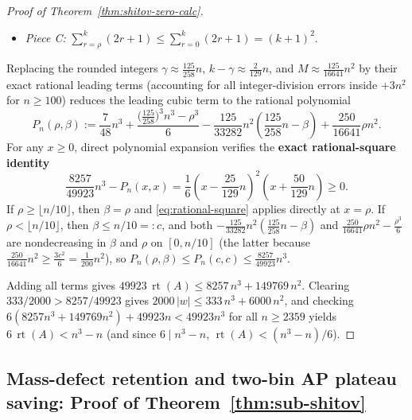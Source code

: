 \documentclass[11pt]{article}
\theoremstyle{definition}
\theoremstyle{remark}
\newcommand{\rt}{\operatorname{rt}}
\begin{document}
\begin{proof}[Proof of Theorem~\ref{thm:shitov-zero-calc}]
\begin{itemize}[leftmargin=2em]
  \[
    \text{Piece B} \le 2 (\gamma + 1)(k - \gamma) \sum_{i=1}^{k} s_i \le 2 \rho (\gamma + 1)(k - \gamma).
  \]
  \item \emph{Piece C:} $\sum_{r=\rho}^k (2r + 1) \le \sum_{r=0}^k (2r + 1) = (k + 1)^2$.
\end{itemize}
Replacing the rounded integers $\gamma \approx \frac{125}{258} n$, $k - \gamma \approx \frac{2}{129} n$, and $M \approx \frac{125}{16641} n^2$ by their exact rational leading terms (accounting for all integer-division errors inside $+3 n^2$ for $n \ge 100$) reduces the leading cubic term to the rational polynomial
\[
  P_n(\rho, \beta) := \frac{7}{48} n^3 + \frac{\bigl(\frac{125}{258}\bigr)^3 n^3 - \rho^3}{6}
    - \frac{125}{33282} n^2 \left(\frac{125}{258} n - \beta\right)
    + \frac{250}{16641} \rho n^2.
\]
For any $x \ge 0$, direct polynomial expansion verifies the \textbf{exact rational-square identity}
\begin{equation}\label{eq:rational-square}
  \frac{8257}{49923} n^3 - P_n(x, x)
  = \frac{1}{6}\left(x - \frac{25}{129} n\right)^2 \left(x + \frac{50}{129} n\right) \ge 0.
\end{equation}
If $\rho \ge \lfloor n/10 \rfloor$, then $\beta = \rho$ and \eqref{eq:rational-square} applies directly at $x = \rho$. If $\rho < \lfloor n/10 \rfloor$, then $\beta \le n/10 =: c$, and both $-\frac{125}{33282} n^2 (\frac{125}{258} n - \beta)$ and $\frac{250}{16641} \rho n^2 - \frac{\rho^3}{6}$ are nondecreasing in $\beta$ and $\rho$ on $[0, n/10]$ (the latter because $\frac{250}{16641} n^2 \ge \frac{3 c^2}{6} = \frac{1}{200} n^2$), so $P_n(\rho, \beta) \le P_n(c, c) \le \frac{8257}{49923} n^3$.

Adding all terms gives $49923\, \rt(A) \le 8257\, n^3 + 149769\, n^2$. Clearing $333/2000 > 8257/49923$ gives $2000\, |w| \le 333\, n^3 + 6000\, n^2$, and checking $6(8257 n^3 + 149769 n^2) + 49923 n < 49923 n^3$ for all $n \ge 2359$ yields $6\, \rt(A) < n^3 - n$ (and since $6 \mid n^3 - n$, $\rt(A) < (n^3 - n)/6$).
\end{proof}

\subsection{Mass-defect retention and two-bin AP plateau saving: Proof of Theorem~\ref{thm:sub-shitov}}\label{sec:sub-shitov-proof}
\end{document}
